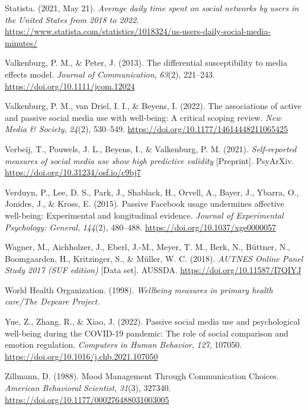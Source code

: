 \documentclass[
  man,floatsintext]{apa7}
\newlength{\cslhangindent}
\newlength{\cslentryspacingunit} %
\newenvironment{CSLReferences}[2] %
 {%
  \setlength{\parindent}{0pt}
  \ifodd #1
  \let\oldpar\par
  \def\par{\hangindent=\cslhangindent\oldpar}
  \fi
  \setlength{\parskip}{#2\cslentryspacingunit}
 }%
 {}
\begin{document}
\begin{CSLReferences}{1}{0}
\leavevmode{}%
Statista. (2021, May 21). \emph{Average daily time spent on social networks by users in the {United States} from 2018 to 2022}. \url{https://www.statista.com/statistics/1018324/us-users-daily-social-media-minutes/}

\leavevmode{}%
Valkenburg, P. M., \& Peter, J. (2013). The differential susceptibility to media effects model. \emph{Journal of Communication}, \emph{63}(2), 221--243. \url{https://doi.org/10.1111/jcom.12024}

\leavevmode{}%
Valkenburg, P. M., van Driel, I. I., \& Beyens, I. (2022). The associations of active and passive social media use with well-being: {A} critical scoping review. \emph{New Media \& Society}, \emph{24}(2), 530--549. \url{https://doi.org/10.1177/14614448211065425}

\leavevmode{}%
Verbeij, T., Pouwels, J. L., Beyens, I., \& Valkenburg, P. M. (2021). \emph{Self-reported measures of social media use show high predictive validity} {[}Preprint{]}. {PsyArXiv}. \url{https://doi.org/10.31234/osf.io/c9bj7}

\leavevmode{}%
Verduyn, P., Lee, D. S., Park, J., Shablack, H., Orvell, A., Bayer, J., Ybarra, O., Jonides, J., \& Kross, E. (2015). Passive {Facebook} usage undermines affective well-being: {Experimental} and longitudinal evidence. \emph{Journal of Experimental Psychology: General}, \emph{144}(2), 480--488. \url{https://doi.org/10.1037/xge0000057}

\leavevmode{}%
Wagner, M., Aichholzer, J., Eberl, J.-M., Meyer, T. M., Berk, N., Büttner, N., Boomgaarden, H., Kritzinger, S., \& Müller, W. C. (2018). \emph{{AUTNES Online Panel Study} 2017 ({SUF} edition)} {[}Data set{]}. {AUSSDA}. \url{https://doi.org/10.11587/I7QIYJ}

\leavevmode{}%
World Health Organization. (1998). \emph{Wellbeing measures in primary health care/{The Depcare Project}}.

\leavevmode{}%
Yue, Z., Zhang, R., \& Xiao, J. (2022). Passive social media use and psychological well-being during the {COVID-19} pandemic: {The} role of social comparison and emotion regulation. \emph{Computers in Human Behavior}, \emph{127}, 107050. \url{https://doi.org/10.1016/j.chb.2021.107050}

\leavevmode{}%
Zillmann, D. (1988). Mood {Management Through Communication Choices}. \emph{American Behavioral Scientist}, \emph{31}(3), 327340. \url{https://doi.org/10.1177/000276488031003005}

\end{CSLReferences}
\end{document}
